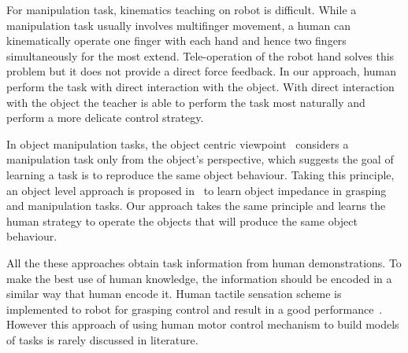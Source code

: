 For manipulation task, kinematics teaching on robot is difficult. While a manipulation task usually involves multifinger movement, a human can kinematically operate one finger with each hand and hence two fingers simultaneously for the most extend. Tele-operation of the robot hand solves this problem but it does not provide a direct force feedback. In our approach, human perform the task with direct interaction with the object. With direct interaction with the object the teacher is able to perform the task most naturally and perform a more delicate control strategy. %


In object manipulation tasks, the object centric viewpoint~\cite{okamura2000overview} considers a manipulation task only from the object's perspective, which suggests the goal of learning a task is to reproduce the same object behaviour. Taking this principle, an object level approach is proposed in~\cite{Miao2014} to learn object impedance in grasping and manipulation tasks. Our approach takes the same principle and learns the human strategy to operate the objects that will produce the same object behaviour.

All the these approaches obtain task information from human demonstrations. To make the best use of human knowledge, the information should be encoded in a similar way that human encode it. Human tactile sensation scheme is implemented to robot for grasping control and result in a good performance~\cite{romano2011human}. However this approach of using human motor control mechanism to build models of tasks is rarely discussed in literature.




